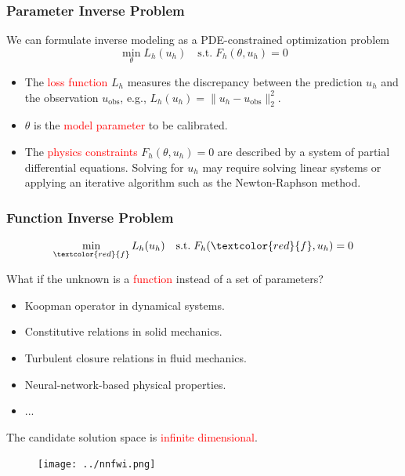 \documentclass[usenames,dvipsnames]{beamer}
\begin{document}
\begin{frame}
	\frametitle{Parameter Inverse Problem}
	We can formulate inverse modeling as a PDE-constrained optimization problem 
	\begin{equation*}
		\min_{\theta} L_h(u_h) \quad \mathrm{s.t.}\; F_h(\theta, u_h) = 0
	\end{equation*}
	\begin{itemize}
		\item The \textcolor{red}{loss function} $L_h$ measures the discrepancy between the prediction $u_h$ and the observation $u_{\mathrm{obs}}$, e.g., $L_h(u_h) = \|u_h - u_{\mathrm{obs}}\|_2^2$. 
		\item $\theta$ is the \textcolor{red}{model parameter} to be calibrated. 
		\item The \textcolor{red}{physics constraints} $F_h(\theta, u_h)=0$ are described by a system of partial differential equations. Solving for $u_h$ may require solving linear systems or applying an iterative algorithm such as the Newton-Raphson method. 
	\end{itemize}
\end{frame}




\begin{frame}
	\frametitle{Function Inverse Problem}
	
	\begin{equation*}
		\min_{\textcolor{red}{f}} L_h(u_h) \quad \mathrm{s.t.}\; F_h(\textcolor{red}{f}, u_h) = 0
	\end{equation*}
	
	What if the unknown is a \textcolor{red}{function} instead of a set of parameters?
\begin{itemize}
	\item Koopman operator in dynamical systems.
	\item Constitutive relations in solid mechanics. 
	\item Turbulent closure relations in fluid mechanics.
	\item Neural-network-based physical properties.
	\item ...
\end{itemize}

The candidate solution space is \textcolor{red}{infinite dimensional}.


	\begin{figure}[hbt]
	\texttt{[image: ../nnfwi.png]}
\end{figure}
\end{frame}
\end{document}
